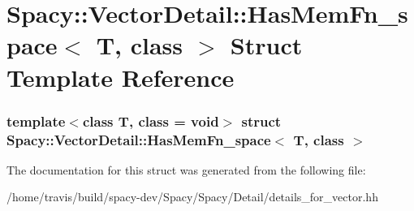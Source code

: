 \hypertarget{structSpacy_1_1VectorDetail_1_1HasMemFn__space}{\section{\-Spacy\-:\-:\-Vector\-Detail\-:\-:\-Has\-Mem\-Fn\-\_\-space$<$ \-T, class $>$ \-Struct \-Template \-Reference}
\label{structSpacy_1_1VectorDetail_1_1HasMemFn__space}
}
\subsubsection*{template$<$class T, class = void$>$ struct Spacy\-::\-Vector\-Detail\-::\-Has\-Mem\-Fn\-\_\-space$<$ T, class $>$}



\-The documentation for this struct was generated from the following file\-:\begin{DoxyCompactItemize}
\item 
/home/travis/build/spacy-\/dev/\-Spacy/\-Spacy/\-Detail/details\-\_\-for\-\_\-vector.\-hh\end{DoxyCompactItemize}
